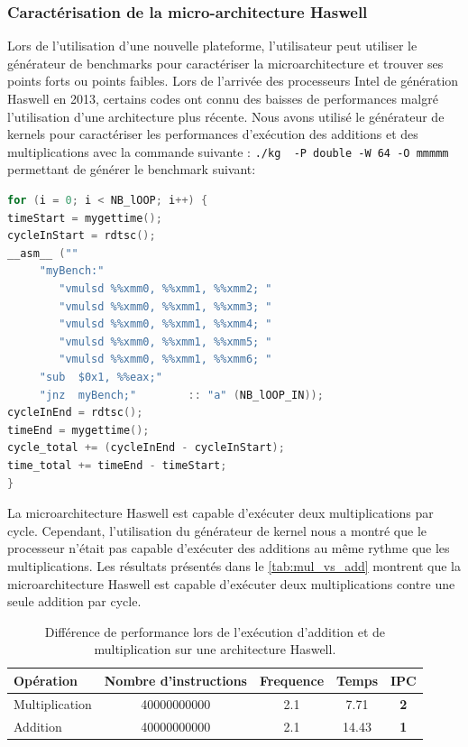     
    \subsubsection{Caractérisation de la micro-architecture Haswell}
    Lors de l'utilisation d'une nouvelle plateforme, l'utilisateur peut utiliser le générateur de benchmarks pour caractériser la microarchitecture et trouver ses points forts ou points faibles. Lors de l'arrivée des processeurs Intel de génération Haswell en 2013, certains codes ont connu des baisses de performances malgré l'utilisation d'une architecture plus récente. Nous avons utilisé le générateur de kernels pour caractériser les performances d'exécution des additions et des multiplications avec la commande suivante : \verb|./kg  -P double -W 64 -O mmmmm| permettant de générer le benchmark suivant:
    
    \begin{minipage}{0.97\linewidth}         \begin{lstlisting}[label=lst:kg_mul ,language=C]
for (i = 0; i < NB_lOOP; i++) {
timeStart = mygettime();
cycleInStart = rdtsc();
__asm__ ("" 
     "myBench:"  
   		"vmulsd %%xmm0, %%xmm1, %%xmm2; "
   		"vmulsd %%xmm0, %%xmm1, %%xmm3; "
   		"vmulsd %%xmm0, %%xmm1, %%xmm4; "
   		"vmulsd %%xmm0, %%xmm1, %%xmm5; "
   		"vmulsd %%xmm0, %%xmm1, %%xmm6; "
     "sub  $0x1, %%eax;"
     "jnz  myBench;"		:: "a" (NB_lOOP_IN));
cycleInEnd = rdtsc();
timeEnd = mygettime();
cycle_total += (cycleInEnd - cycleInStart);
time_total += timeEnd - timeStart;
}
\end{lstlisting} \end{minipage}
    
     La microarchitecture Haswell est capable d'exécuter deux multiplications par cycle. Cependant, l'utilisation du générateur de kernel nous a montré que le processeur n'était pas capable d'exécuter des additions au même rythme que les multiplications. Les résultats présentés dans le \autoref{tab:mul_vs_add} montrent que la microarchitecture Haswell est capable d'exécuter deux multiplications contre une seule addition par cycle.

    \begin{table}[h!]
    \centering
    \begin{tabular}{|l|c|c|c|c|}
        \hline
        Opération & Nombre d'instructions & Frequence & Temps & IPC \\ \hline
        Multiplication & 40000000000 & 2.1 & 7.71 & \textbf{2} \\ \hline
        Addition & 40000000000 & 2.1 & 14.43 & {\color[HTML]{963400} \textbf{1}} \\ \hline
        \end{tabular}%
        
        \caption{Différence de performance lors de l'exécution d'addition et de multiplication sur une architecture Haswell.}
        \label{tab:mul_vs_add}
    \end{table}
    
